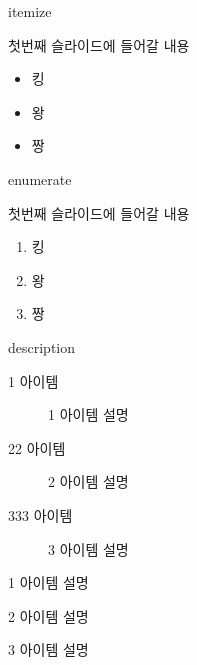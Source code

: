 \documentclass[10pt,blue,xcolor=pdftex,dvipsnames,table,handout]{beamer}
\begin{document}
		\begin{frame}[t]{itemize}

			첫번째 슬라이드에 들어갈 내용
			\begin{itemize}
			\item 킹
			\item 왕
			\item 짱
			\end{itemize}

		\end{frame}






		\begin{frame}[t]{enumerate}

			첫번째 슬라이드에 들어갈 내용
			\begin{enumerate}
			\item 킹
			\item 왕
			\item 짱
			\end{enumerate}

		\end{frame}




		\begin{frame}[t]{description}

		\begin{description}
			\item[1 아이템] 1 아이템 설명
			\item[22 아이템] 2 아이템 설명
			\item[333 아이템] 3 아이템 설명

		\end{description}


		\begin{description}[123456789012345]
			\item[1 아이템] 1 아이템 설명
			\item[22 아이템] 2 아이템 설명
			\item[333 아이템] 3 아이템 설명
		\end{description}

		\end{frame}
\end{document}
